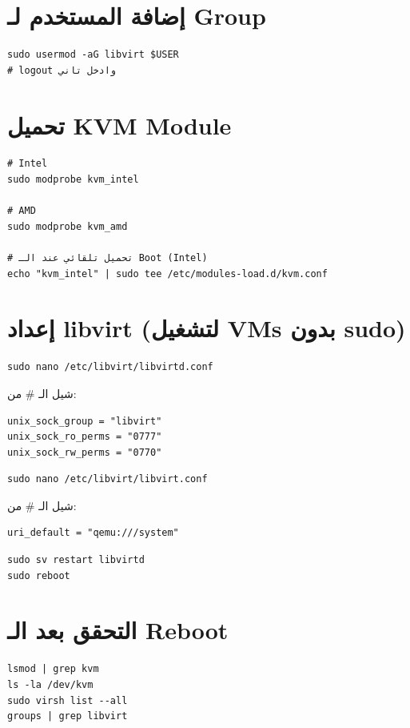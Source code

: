 \documentclass[12pt, a4paper]{report}
\begin{document}
\section{إضافة المستخدم لـ Group}
\begin{lstlisting}
sudo usermod -aG libvirt $USER
# logout وادخل تاني
\end{lstlisting}

\section{تحميل KVM Module}
\begin{lstlisting}
# Intel
sudo modprobe kvm_intel

# AMD
sudo modprobe kvm_amd

# تحميل تلقائي عند الـ Boot (Intel)
echo "kvm_intel" | sudo tee /etc/modules-load.d/kvm.conf
\end{lstlisting}

\section{إعداد libvirt (لتشغيل VMs بدون sudo)}
\begin{lstlisting}
sudo nano /etc/libvirt/libvirtd.conf
\end{lstlisting}

شيل الـ \# من:
\begin{lstlisting}[style=inistyle]
unix_sock_group = "libvirt"
unix_sock_ro_perms = "0777"
unix_sock_rw_perms = "0770"
\end{lstlisting}

\begin{lstlisting}
sudo nano /etc/libvirt/libvirt.conf
\end{lstlisting}

شيل الـ \# من:
\begin{lstlisting}[style=inistyle]
uri_default = "qemu:///system"
\end{lstlisting}

\begin{lstlisting}
sudo sv restart libvirtd
sudo reboot
\end{lstlisting}

\section{التحقق بعد الـ Reboot}
\begin{lstlisting}
lsmod | grep kvm
ls -la /dev/kvm
sudo virsh list --all
groups | grep libvirt
\end{lstlisting}
\end{document}
